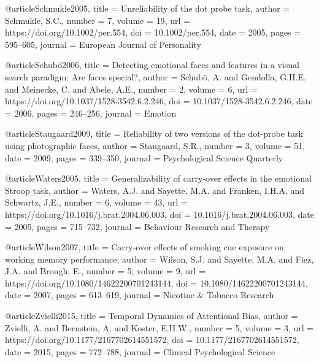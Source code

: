 @article{Schmukle2005,
    title       = {Unreliability of the dot probe task},
    author      = {Schmukle, S.C.},
    number      = {7},
    volume      = {19},
    url         = {https://doi.org/10.1002/per.554},
    doi         = {10.1002/per.554},
    date        = {2005},
    pages       = {595–605},
    journal     = {European Journal of Personality}
}


@article{Schubö2006,
    title       = {Detecting emotional faces and features in a visual search paradigm: Are faces special?},
    author      = {Schubö, A. and Gendolla, G.H.E. and Meinecke, C. and Abele, A.E.},
    number      = {2},
    volume      = {6},
    url         = {https://doi.org/10.1037/1528-3542.6.2.246},
    doi         = {10.1037/1528-3542.6.2.246},
    date        = {2006},
    pages       = {246–256},
    journal     = {Emotion}
}


@article{Staugaard2009,
    title       = {Reliability of two versions of the dot-probe task using photographic faces},
    author      = {Staugaard, S.R.},
    number      = {3},
    volume      = {51},
    date        = {2009},
    pages       = {339–350},
    journal     = {Psychological Science Quarterly}
}


@article{Waters2005,
    title       = {Generalizability of carry-over effects in the emotional Stroop task},
    author      = {Waters, A.J. and Sayette, M.A. and Franken, I.H.A. and Schwartz, J.E.},
    number      = {6},
    volume      = {43},
    url         = {https://doi.org/10.1016/j.brat.2004.06.003},
    doi         = {10.1016/j.brat.2004.06.003},
    date        = {2005},
    pages       = {715–732},
    journal     = {Behaviour Research and Therapy}
}


@article{Wilson2007,
    title       = {Carry-over effects of smoking cue exposure on working memory performance},
    author      = {Wilson, S.J. and Sayette, M.A. and Fiez, J.A. and Brough, E.},
    number      = {5},
    volume      = {9},
    url         = {https://doi.org/10.1080/14622200701243144},
    doi         = {10.1080/14622200701243144},
    date        = {2007},
    pages       = {613–619},
    journal     = {Nicotine & Tobacco Research}
}


@article{Zvielli2015,
    title       = {Temporal Dynamics of Attentional Bias},
    author      = {Zvielli, A. and Bernstein, A. and Koster, E.H.W.},
    number      = {5},
    volume      = {3},
    url         = {https://doi.org/10.1177/2167702614551572},
    doi         = {10.1177/2167702614551572},
    date        = {2015},
    pages       = {772–788},
    journal     = {Clinical Psychological Science}
}
